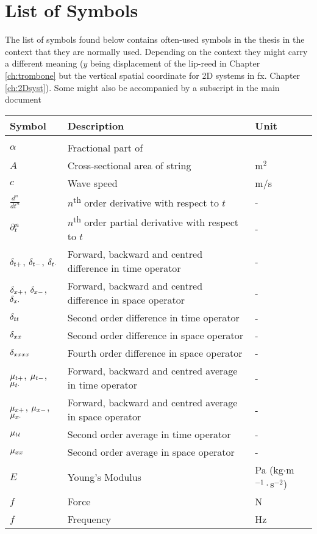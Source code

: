 \chapter{List of Symbols}\label{app:listOfSymbols}
The list of symbols found below contains often-used symbols in the thesis in the context that they are normally used. Depending on the context they might carry a different meaning ($y$ being displacement of the lip-reed in Chapter \ref{ch:trombone} but the vertical spatial coordinate for 2D systems in fx. Chapter \ref{ch:2Dsyst}). Some might also be accompanied by a subscript in the main document

{\centering\renewcommand{\arraystretch}{1.1}
\begin{longtable}{ p{2cm} p{6.5cm} p{2.5cm}  }
 Symbol & Description & Unit\\
 \hline\\
 \endhead
 $\alpha$ & Fractional part of & \\
 $A$ & Cross-sectional area of string & m$^2$\\
 $c$ & Wave speed & m/s\\
 $\frac{d^n}{dt^n}$ & $n$\textsuperscript{th} order derivative with respect to $t$ & - \\
 $\partial_t^n$ & $n$\textsuperscript{th} order partial derivative with respect to $t$ & - \\
 $\delta_{t+}$, $\delta_{t-}$, $\delta_{t\cdot}$ & Forward, backward and centred difference in time operator & - \\
 $\delta_{x+}$, $\delta_{x-}$, $\delta_{x\cdot}$ & Forward, backward and centred difference in space operator& - \\
 $\delta_{tt}$& Second order difference in time operator& - \\
 $\delta_{xx}$& Second order difference in space operator& - \\
 $\delta_{xxxx}$& Fourth order difference in space operator& - \\
 $\mu_{t+}$, $\mu_{t-}$, $\mu_{t\cdot}$ & Forward, backward and centred average in time operator& - \\
 $\mu_{x+}$, $\mu_{x-}$, $\mu_{x\cdot}$ & Forward, backward and centred average in space operator& - \\
 $\mu_{tt}$ & Second order average in time operator& -\\
 $\mu_{xx}$ & Second order average in space operator& -\\
 $E$ & Young's Modulus & Pa (kg$\cdot$m$^{-1}\cdot$s$^{-2}$)\\
 $f$ & Force & N\\
 $f$ & Frequency & Hz\\

\end{longtable}}
